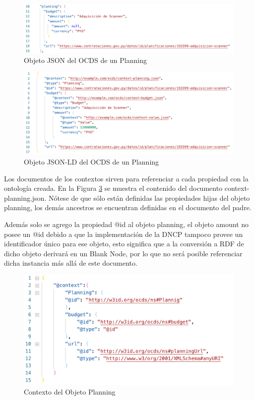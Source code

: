 \begin{figure}[h!]
    \centering
    \includegraphics[width=150mm]{figuras/2}
    \caption{Objeto JSON del OCDS de un Planning}
    \label{img:json2}
    \end{figure}

\begin{figure}[h!]
    \centering
    \includegraphics[width=150mm]{figuras/3}
    \caption{Objeto JSON-LD del OCDS de un Planning}
    \label{img:json3}
    \end{figure}


Los documentos de los contextos sirven para referenciar a cada propiedad con la ontología creada. En la Figura \ref{img:json4} se muestra el contenido del documento context-planning.json. Nótese de que sólo están definidas las propiedades hijas del objeto planning, los demás ancestros se encuentran definidas en el documento del padre.

Además solo se agrego la propiedad @id al objeto planning, el objeto amount no posee un @id debido a que la implementación de la DNCP tampoco provee un identificador único para ese objeto, esto significa que a la conversión a RDF de dicho objeto derivará en un Blank Node, por lo que no será posible referenciar dicha instancia más allá de este documento.


\begin{figure}[h!]
    \centering
    \includegraphics[width=150mm]{figuras/4}
    \caption{Contexto del Objeto Planning }
    \label{img:json4}
    \end{figure}


